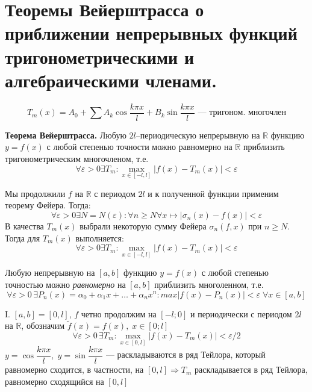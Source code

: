 \section{Теоремы Вейерштрасса о приближении непрерывных функций тригонометрическими и алгебраическими членами.}
\[
	T_m(x) = A_0 + \sum A_k \cos \dfrac{k\pi x}{l} + B_k \sin \dfrac{k \pi x}{l}\text{ --- тригоном. многочлен}
\]
\begin{greyTheorem}
	\textbf{Теорема Вейерштрасса.} Любую $ 2l $--периодическую непрерывную на $ \mathbb{R} $ функцию $ y = f(x) $ с любой степенью точности можно равномерно на $ \mathbb{R} $ приблизить тригонометрическим многочленом, т.е.
	\[
		\forall \varepsilon > 0 \exists T_m: \max_{x \in [-l,l]} |f(x) - T_m(x) | < \varepsilon
	\]
\end{greyTheorem}
\begin{greyProof}
	Мы продолжили $ f $ на $ \mathbb{R} $ с периодом $ 2l $ и к полученной функции применим теорему Фейера. Тогда:
	\[
		\forall \varepsilon>0 \exists N = N(\varepsilon): \forall n \geqslant N \forall x \mapsto |\sigma_{n}(x) - f(x) | < \varepsilon
	\]
	В качества $ T_m(x) $ выбрали некоторую сумму Фейера $ \sigma_n(f,x) $ при $ n \geqslant N $. Тогда для $ T_m(x)  $ выполняется:
	\[
\forall \varepsilon > 0 \exists T_m: \max_{x \in [-l,l]} |f(x) - T_m(x) | < \varepsilon
\]
\end{greyProof}
\begin{greyTheorem}
	Любую непрерывную на $ [a,b]  $ функцию $ y=f(x) $ с любой степенью точностью можно \textit{равномерно} на $ [a,b] $ приблизить многоленном, т.е. \[
	\forall \varepsilon > 0 \, \exists P_n(x) = \alpha_0 + \alpha_1 x + \ldots + \alpha_n x^n: max|f(x) - P_n(x) | < \varepsilon \;\forall x \in [a,b]
	\]
\end{greyTheorem}
\begin{greyProof}
	I. $ [a,b] = [0,l] $, $ f $ четно продолжим на $ [-l;0] $ и периодически с периодом $ 2l $ на $ \mathbb{R} $, обозначим $  \tilde{f}(x) =f(x),\; x\in [0;l] $
	\[
		\forall \varepsilon > 0 \, \exists T_m: \max_{x\in[0,l]} |f(x) - T_m(x) | < \varepsilon/2
	\]
	$ y = \cos \dfrac{k \pi x}{l},\; y = \sin \dfrac{k\pi x}{l} $ --- раскладываются в ряд Тейлора, который равномерно сходится, в частности, на $ [0,l] \Rightarrow T_m$ раскладывается в ряд Тейлора, равномерно сходящийся на $ [0,l] $
\end{greyProof}
